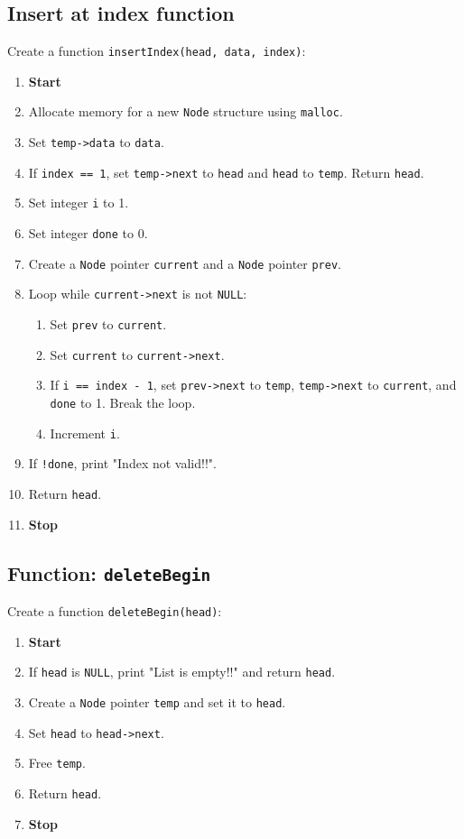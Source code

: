 {  \subsection{Insert at index function}
  Create a function \texttt{insertIndex(head, data, index)}:
  \begin{enumerate}[label=\arabic*:,left=0pt]
    \item \textbf{Start}
    \item Allocate memory for a new \texttt{Node} structure using \texttt{malloc}.
    \item Set \texttt{temp->data} to \texttt{data}.
    \item If \texttt{index == 1}, set \texttt{temp->next} to \texttt{head} and \texttt{head} to \texttt{temp}. Return \texttt{head}.
    \item Set integer \texttt{i} to 1.
    \item Set integer \texttt{done} to 0.
    \item Create a \texttt{Node} pointer \texttt{current} and a \texttt{Node} pointer \texttt{prev}.
    \item Loop while \texttt{current->next} is not \texttt{NULL}:
          \begin{enumerate}[label=2.\arabic*:, start=1]
            \item Set \texttt{prev} to \texttt{current}.
            \item Set \texttt{current} to \texttt{current->next}.
            \item If \texttt{i == index - 1}, set \texttt{prev->next} to \texttt{temp}, \texttt{temp->next} to \texttt{current}, and \texttt{done} to 1. \newline Break the loop.
            \item Increment \texttt{i}.
          \end{enumerate}
    \item If \texttt{!done}, print "Index not valid!!".
    \item Return \texttt{head}.
    \item \textbf{Stop}
  \end{enumerate}

  \subsection{Function: \texttt{deleteBegin}}
  Create a function \texttt{deleteBegin(head)}:
  \begin{enumerate}[label=\arabic*:,left=0pt]
    \item \textbf{Start}
    \item If \texttt{head} is \texttt{NULL}, print "List is empty!!" and return \texttt{head}.
    \item Create a \texttt{Node} pointer \texttt{temp} and set it to \texttt{head}.
    \item Set \texttt{head} to \texttt{head->next}.
    \item Free \texttt{temp}.
    \item Return \texttt{head}.
    \item \textbf{Stop}
  \end{enumerate}

}
